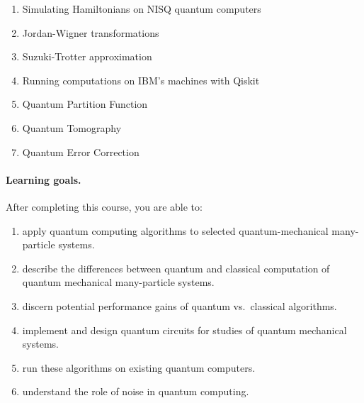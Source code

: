 \documentclass[%
oneside,                 %
final,                   %
10pt]{article}
\begin{document}
\begin{enumerate}
\item Simulating Hamiltonians on NISQ quantum computers

\item Jordan-Wigner transformations

\item Suzuki-Trotter approximation

\item Running computations on IBM's machines with Qiskit

\item Quantum Partition Function

\item Quantum Tomography

\item Quantum Error Correction
\end{enumerate}

\noindent




\paragraph{Learning goals.}
After completing this course, you are able to: 
\begin{enumerate}
\item apply quantum computing algorithms to selected quantum-mechanical many-particle systems.  

\item describe the differences between quantum and classical computation of quantum mechanical many-particle systems.  

\item discern potential performance gains of quantum vs.~classical algorithms.

\item implement and design quantum circuits for studies of quantum mechanical systems.  

\item run these algorithms on existing quantum computers.  

\item understand the role of noise in quantum computing.  
\end{enumerate}

\noindent



\end{document}
